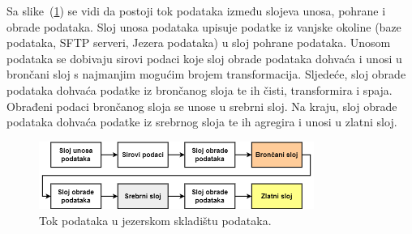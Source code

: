 Sa slike~(\ref{figure:datalakehouse_data_flow}) se vidi da postoji tok podataka
između slojeva unosa, pohrane i obrade podataka. Sloj unosa podataka upisuje
podatke iz vanjske okoline (baze podataka, SFTP serveri, Jezera podataka) u sloj
pohrane podataka. Unosom podataka se dobivaju sirovi podaci koje sloj obrade
podataka dohvaća i unosi u brončani sloj s najmanjim mogućim brojem
transformacija. Sljedeće, sloj obrade podataka dohvaća podatke iz brončanog
sloja te ih čisti, transformira i spaja. Obrađeni podaci brončanog sloja se
unose u srebrni sloj. Na kraju, sloj obrade podataka dohvaća podatke iz srebrnog
sloja te ih agregira i unosi u zlatni sloj. 

\begin{figure}
    \centering
    \includegraphics[width=0.8\textwidth]{images/tok_podataka.drawio.png}
    \caption{Tok podataka u jezerskom skladištu podataka.}
    \label{figure:datalakehouse_data_flow}
\end{figure}